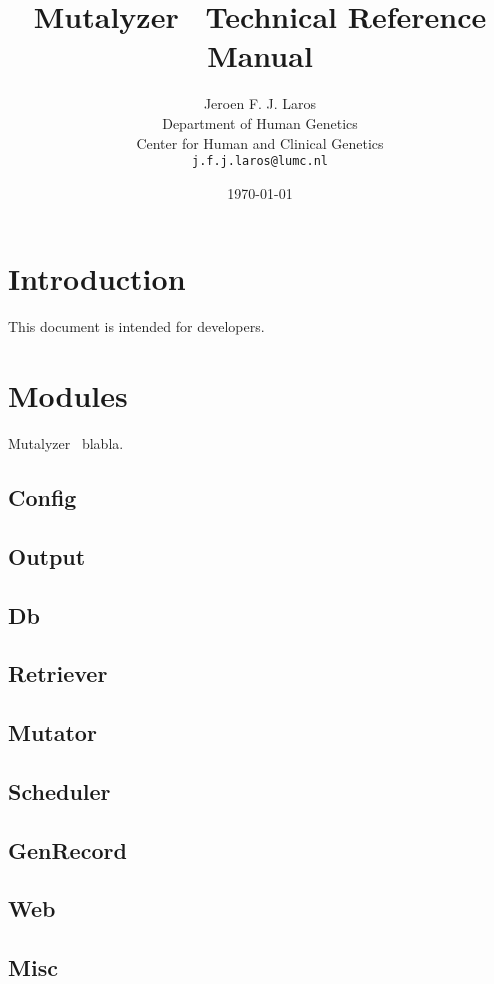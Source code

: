 \documentclass{article}
\title{\Huge Mutalyzer \thisversion\ Technical Reference Manual}
\author{Jeroen F. J. Laros
        \vspace{10pt}\\
        Department of Human Genetics\\
        Center for Human and Clinical Genetics\\
        \texttt{j.f.j.laros@lumc.nl}}
\date{\today}
\theoremstyle{definition}
\begin{document}
\maketitle
\thispagestyle{empty}
\newpage

\tableofcontents
\newpage


\section{Introduction}\label{sec:introduction}
This document is intended for developers.

\section{Modules}\label{sec:modules}
Mutalyzer \thisversion\ blabla.
\subsection{Config}\label{subsec:config}
\subsection{Output}\label{subsec:output}
\subsection{Db}\label{subsec:db}
\subsection{Retriever}\label{subsec:retriever}
\subsection{Mutator}\label{subsec:mutator}
\subsection{Scheduler}\label{subsec:scheduler}
\subsection{GenRecord}\label{subsec:genrecord}
\subsection{Web}\label{subsec:web}
\subsection{Misc}\label{subsec:misc}
\end{document}
